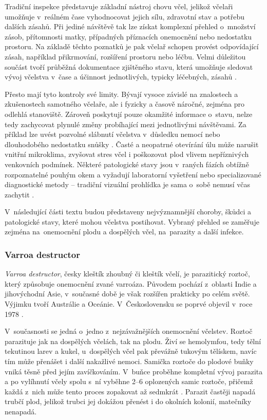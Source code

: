 Tradiční inspekce představuje základní nástroj chovu včel, jelikož včelaři umožňuje v~reálném čase vyhodnocovat jejich sílu, zdravotní stav a potřebu dalších zásahů. Při jediné návštěvě tak lze získat komplexní přehled o~množství zásob, přítomnosti matky, případných příznacích onemocnění nebo nedostatku prostoru. Na základě těchto poznatků je pak včelař schopen provést odpovídající zásah, například přikrmování, rozšíření prostoru nebo léčbu. Velmi důležitou součást tvoří průběžná dokumentace zjištěného stavu, která umožňuje sledovat vývoj včelstva v~čase a účinnost jednotlivých, typicky léčebných, zásahů \cite{Gerstmeier}.

Přesto mají tyto kontroly své limity. Bývají vysoce závislé na znalostech a zkušenostech samotného včelaře, ale i fyzicky a časově náročné, zejména pro odlehlá stanoviště. Zároveň poskytují pouze okamžité informace o~stavu, nelze tedy zachycovat plynulé změny probíhající mezi jednotlivými návštěvami. Za příklad lze uvést pozvolné slábnutí včelstva v~důsledku nemocí nebo dlouhodobého nedostatku snůšky \cite{Cecchi}. Časté a neopatrné otevírání úlu může narušit vnitřní mikroklima, zvyšovat stres včel i poškozovat plod vlivem nepříznivých venkovních podmínek. Některé patologické stavy jsou v~raných fázích obtížně rozpoznatelné pouhým okem a vyžadují laboratorní vyšetření nebo specializované diagnostické metody -- tradiční vizuální prohlídka je sama o~sobě nemusí včas zachytit \cite{Ritter}.

V~následující části textu budou představeny nejvýznamnější choroby, škůdci a patologické stavy, které mohou včelstva postihovat. Vybraný přehled se zaměřuje zejména na~onemocnění plodu a dospělých včel, na~parazity a další infekce.

\subsubsection*{Varroa destructor}
\textit{Varroa destructor}, česky kleštík zhoubný či kleštík včelí, je parazitický roztoč, který způsobuje onemocnění zvané varroáza. Původem pochází z~oblasti Indie a jihovýchodní Asie, v~současné době je však rozšířen prakticky po celém světě. Výjimku tvoří Austrálie a Oceánie. V~Československu se poprvé objevil v~roce 1978 \cite{varroaza}.

V~současnosti se jedná o~jedno z~nejzávažnějších onemocnění včelstev. Roztoč parazituje jak na dospělých včelách, tak na plodu. Živí se hemolymfou, tedy tělní tekutinou larev a kukel, u~dospělých včel pak převážně tukovým tělískem, navíc tím může přenášet i další nakažlivé nemoci. Samička roztoče do plodové buňky vniká těsně před jejím zavíčkováním. V~buňce proběhne kompletní vývoj parazita a po vylíhnutí včely spolu s~ní vyběhne 2--6 oplozených samic roztoče, přičemž každá z~nich může tento proces zopakovat až sedmkrát \cite{vuvVarroaza}. Parazit častěji napadá trubčí plod, jelikož trubci jej dokážou přenést i do okolních kolonií, matečníky nenapadá.

